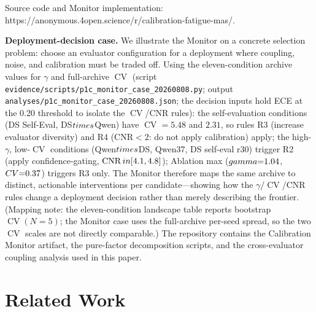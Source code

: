 \documentclass[11pt]{article}
\DeclareMathOperator{\CV}{CV}
\DeclareMathOperator{\CNR}{CNR}
\begin{document}
\noindent Source code and Monitor implementation: https://anonymous.4open.science/r/calibration-fatigue-mas/.

\noindent\textbf{Deployment-decision case.} We illustrate the Monitor on a concrete selection problem: choose an evaluator configuration for a deployment where coupling, noise, and calibration must be traded off. Using the eleven-condition archive values for $\gamma$ and full-archive $\CV$ (script \texttt{evidence/scripts/p1c\_monitor\_case\_20260808.py}; output \texttt{analyses/p1c\_monitor\_case\_20260808.json}; the decision inputs hold ECE at the 0.20 threshold to isolate the $\CV$/CNR rules): the self-evaluation conditions (DS Self-Eval, DS$\\times$Qwen) have $\CV{=}5.48$ and $2.31$, so rules R3 (increase evaluator diversity) and R4 (CNR$<2$: do not apply calibration) apply; the high-$\gamma$, low-$\CV$ conditions (Qwen$\\times$DS, Qwen37, DS self-eval r30) trigger R2 (apply confidence-gating, $\CNR \\in [4.1, 4.8]$); Ablation max ($\\gamma{=}1.04$, $\\CV{=}0.37$) triggers R3 only. The Monitor therefore maps the same archive to distinct, actionable interventions per candidate---showing how the $\gamma$/$\CV$/CNR rules change a deployment decision rather than merely describing the frontier. (Mapping note: the eleven-condition landscape table reports bootstrap $\CV(N{=}5)$; the Monitor case uses the full-archive per-seed spread, so the two $\CV$ scales are not directly comparable.)
The repository contains the Calibration Monitor artifact, the pure-factor decomposition scripts, and the cross-evaluator coupling analysis used in this paper.


\section{Related Work}
\end{document}
